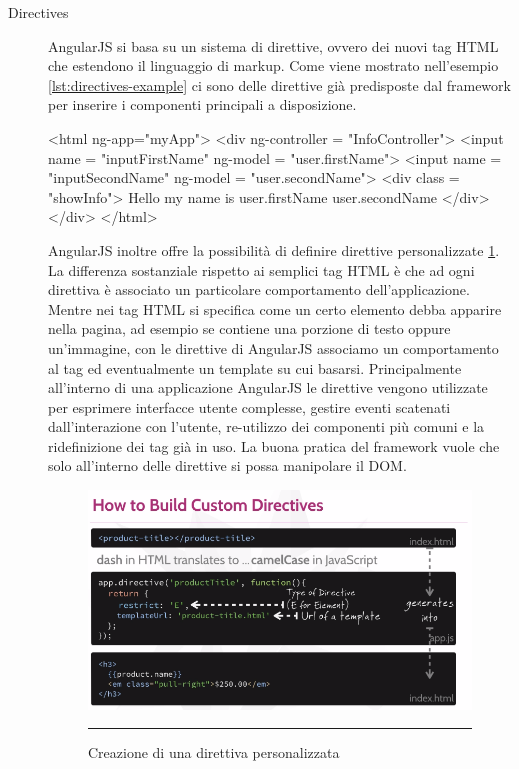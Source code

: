 \begin{description}

\item[Directives] AngularJS si basa su un sistema di direttive, ovvero dei nuovi tag HTML che estendono il linguaggio di markup. Come viene mostrato nell'esempio \ref{lst:directives-example} ci sono delle direttive già predisposte dal framework per inserire i componenti principali a disposizione.

\begin{code}[language=html,caption={Un esempio delle direttive standard di AngularJS},
				   label={lst:directives-example}]
 <html ng-app="myApp">
     <div ng-controller = "InfoController">
       <input name = "inputFirstName" ng-model = "user.firstName">
       <input name = "inputSecondName" ng-model = "user.secondName">
       <div class = "showInfo">
	     Hello my name is {{user.firstName}} {{user.secondName}}			
       </div>
     </div>
 </html>
\end{code}

AngularJS inoltre offre la possibilità di definire direttive personalizzate \ref{fig:custom-directive}. La differenza sostanziale rispetto ai semplici tag HTML è che ad ogni direttiva è associato un particolare comportamento dell'applicazione. Mentre nei tag HTML si specifica come un certo elemento debba apparire nella pagina, ad esempio se contiene una porzione di testo oppure un'immagine, con le direttive di AngularJS associamo un comportamento al tag ed eventualmente un template su cui basarsi.
Principalmente all'interno di una applicazione AngularJS le direttive vengono utilizzate per esprimere interfacce utente complesse, gestire eventi scatenati dall'interazione con l'utente, re-utilizzo dei componenti più comuni e la ridefinizione dei tag già in uso. La buona pratica del framework vuole che solo all'interno delle direttive si possa manipolare il DOM.

\begin{figure}[htbp]
  \centering
    \includegraphics[scale=0.65]{Figures/how-to-build-custom-directives.png} 
    \rule{35em}{0.5pt}
  \caption[Custom Directive]{Creazione di una direttiva personalizzata}
  \label{fig:custom-directive}
\end{figure}


\end{description}
